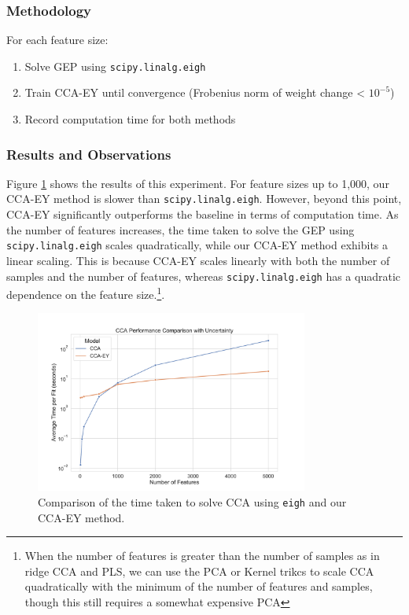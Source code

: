 \subsubsection{Methodology}
For each feature size:
\begin{enumerate}
    \item Solve GEP using \texttt{scipy.linalg.eigh}
    \item Train CCA-EY until convergence (Frobenius norm of weight change < $10^{-5}$)
    \item Record computation time for both methods
\end{enumerate}

\subsubsection{Results and Observations}
Figure \ref{fig:cca-comparison} shows the results of this experiment. For feature sizes up to 1,000, our CCA-EY method is slower than \texttt{scipy.linalg.eigh}. However, beyond this point, CCA-EY significantly outperforms the baseline in terms of computation time.
As the number of features increases, the time taken to solve the GEP using \texttt{scipy.linalg.eigh} scales quadratically, while our CCA-EY method exhibits a linear scaling. This is because CCA-EY scales linearly with both the number of samples and the number of features, whereas \texttt{scipy.linalg.eigh} has a quadratic dependence on the feature size.\footnote{When the number of features is greater than the number of samples as in ridge CCA and PLS, we can use the PCA or Kernel trikcs to scale CCA quadratically with the minimum of the number of features and samples, though this still requires a somewhat expensive PCA}.

\begin{figure}
    \centering
    \includegraphics[width=0.8\textwidth]{figures/benchmarks/cca_comparison_log}
    \caption{Comparison of the time taken to solve CCA using \texttt{eigh} and our CCA-EY method.}
    \label{fig:cca-comparison}
\end{figure}

